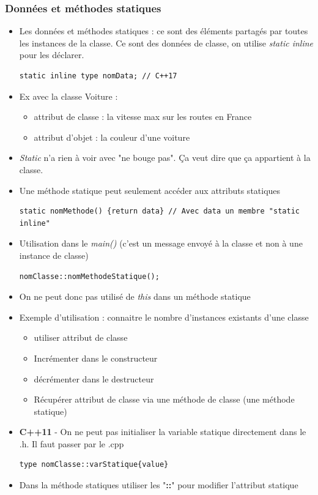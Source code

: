 \documentclass[12pt,a4paper]{article}
\begin{document}
\subsubsection{Données et méthodes statiques}
\begin{itemize}
\item Les données et méthodes statiques : ce sont des éléments partagés par toutes les instances de la classe. Ce sont des données de classe, on utilise \textit{static inline} pour les déclarer.
\begin{lstlisting}
static inline type nomData; // C++17
\end{lstlisting}
\item Ex avec la classe Voiture :
\begin{itemize}
\item attribut de classe : la vitesse max sur les routes en France
\item attribut d'objet : la couleur d'une voiture
\end{itemize}
\item \textit{Static} n'a rien à voir avec "ne bouge pas". Ça veut dire que ça appartient à la classe.
\item Une méthode statique peut seulement accéder aux attributs statiques
\begin{lstlisting}
static nomMethode() {return data} // Avec data un membre "static inline"
\end{lstlisting}
\item Utilisation dans le \textit{main()} (c'est un message envoyé à la classe et non à une instance de classe)
\begin{lstlisting}
nomClasse::nomMethodeStatique();
\end{lstlisting}
\item On ne peut donc pas utilisé de \textit{this} dans un méthode statique
\item Exemple d'utilisation : connaitre le nombre d'instances existants d'une classe
\begin{itemize}
\item utiliser attribut de classe
\item Incrémenter dans le constructeur
\item décrémenter dans le destructeur
\item Récupérer attribut de classe via une méthode de classe (une méthode statique)
\end{itemize}
\item \textbf{C++11} - On ne peut pas initialiser la variable statique directement dans le .h. Il faut passer par le .cpp
\begin{lstlisting}
type nomClasse::varStatique{value}
\end{lstlisting}
\item Dans la méthode statiques utiliser les "\textbf{::}" pour modifier l'attribut statique
\end{itemize}
\end{document}
